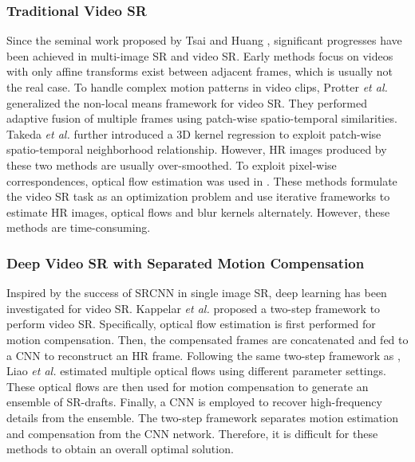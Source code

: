 \documentclass[journal]{IEEEtran}
\begin{document}
	\subsubsection{Traditional Video SR}
	Since the seminal work proposed by Tsai and Huang \cite{1984-MultiframeImageRestorationandRegistration-Tsai--}, significant progresses have been achieved in multi-image SR and  video SR. Early methods
	\cite{1996-ExtractionofHighResolutionFramesfromVideoSequences-Schultz-996-1011,1997-JointMAPRegistrationandHighResolutionImageEstimationUsingaSequenceofUndersampledImages-Hardie-1621-1633} focus on videos with only affine transforms exist between adjacent frames, which is usually not the real case. To handle complex motion patterns in video clips, Protter \emph{et al.} \cite{2009-GeneralizingtheNonlocalMeanstoSuperResolutionReconstruction-Protter-36-51} generalized the non-local means framework for video SR. They performed adaptive fusion of multiple frames using patch-wise spatio-temporal similarities. Takeda \emph{et al.} \cite{2009-SuperResolutionwithoutExplicitSubpixelMotionEstimation-Takeda-1958-1975} further
	introduced a 3D kernel regression to exploit patch-wise spatio-temporal neighborhood
	relationship. However, HR images produced by these two methods are usually over-smoothed. To exploit pixel-wise correspondences, optical flow estimation was used in \cite{2007-OpticalFlowBasedSuperResolution:aProbabilisticApproach-Fransens-106-115,2014-OnBayesianAdaptiveVideoSuperResolution-Liu-346-360,2015-HandlingMotionBlurinMultiFrameSuperResolution-Ma-5224-5232}. These methods formulate the video SR task as an optimization problem and use iterative frameworks to estimate HR images, optical flows and blur kernels alternately. However, these methods are time-consuming.
	
	\subsubsection{Deep Video SR with Separated Motion Compensation}
	Inspired by the success of SRCNN in single image SR, deep learning has been investigated for video SR. Kappelar \emph{et al.} \cite{2016-VideoSuperResolutionwithConvolutionalNeuralNetworks-Kappeler-109-122} proposed a two-step framework to perform video SR. Specifically, optical flow estimation is first performed for motion compensation. Then, the compensated frames are concatenated and fed to a CNN to reconstruct an HR frame. Following the same two-step framework as \cite{2016-VideoSuperResolutionwithConvolutionalNeuralNetworks-Kappeler-109-122}, Liao \emph{et al.} \cite{2015-VideoSuperResolutionViaDeepDraftEnsembleLearning-Liao-531-539} estimated multiple optical flows using different parameter settings. These optical flows are then used for motion compensation to generate an ensemble of SR-drafts. Finally, a CNN is employed to recover high-frequency details from the ensemble. 
	The two-step framework separates motion estimation and compensation from the CNN network. Therefore, it is difficult for these methods to obtain an overall optimal solution.
	
\end{document}
